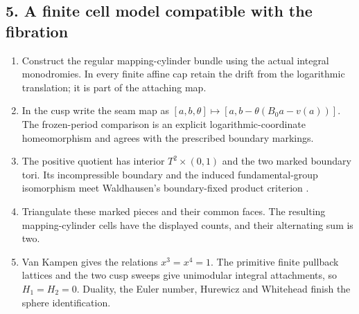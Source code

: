 \subsection*{5. A finite cell model compatible with the fibration}
\RungOne
\begin{enumerate}[label=\arabic*.,leftmargin=*]
\item Construct the regular mapping-cylinder bundle using the actual
integral monodromies.  In every finite affine cap retain the drift
from the logarithmic translation; it is part of the attaching map.
\item In the cusp write the seam map as
$[a,b,\theta]\mapsto[a,b-\theta(B_0a-v(a))]$.
The frozen-period comparison is an explicit logarithmic-coordinate
homeomorphism and agrees with the prescribed boundary markings.
\item The positive quotient has interior $T^2\times(0,1)$ and the
two marked boundary tori.  Its incompressible boundary and the
induced fundamental-group isomorphism meet Waldhausen's
boundary-fixed product criterion
\cite[Theorem~6.1, p.~77]{mapsWaldhausen68}.
\item Triangulate these marked pieces and their common faces.  The
resulting mapping-cylinder cells have the displayed counts, and
their alternating sum is two.
\item Van Kampen gives the relations $x^3=x^4=1$.  The primitive
finite pullback lattices and the two cusp sweeps give unimodular
integral attachments, so $H_1=H_2=0$.  Duality, the Euler number,
Hurewicz and Whitehead finish the sphere identification.
\end{enumerate}

